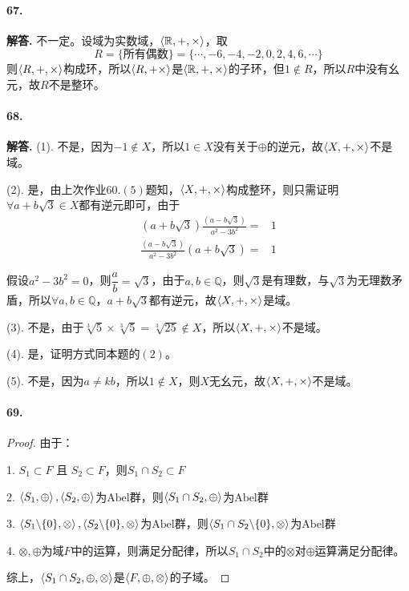 \documentclass[12pt, a4paper, oneside]{ctexart}
\newenvironment{solution}{\par\noindent\textbf{解答. }}{\bigskip\par}
\begin{document}
\paragraph{67.}\begin{solution}
    不一定。设域为实数域，$\braket{\mathbb{R}, +, \times}$，取
    \begin{equation*}
        R = \{\text{所有偶数}\} = \{\cdots, -6,-4,-2,0,2,4,6,\cdots\}
    \end{equation*}
    则$\braket{R,+,\times}$构成环，所以$\braket{R,+\times}$是$\braket{\mathbb{R},+,\times}$的子环，但$1\notin R$，所以$R$中没有幺元，故$R$不是整环。
\end{solution}
\paragraph{68.}\begin{solution}
    (1). 不是，因为$-1\notin X$，所以$1\in X$没有关于$\oplus$的逆元，故$\braket{X,+,\times}$不是域。

    (2). 是，由上次作业$60.(5)$题知，$\braket{X,+,\times}$构成整环，则只需证明$\forall a+b\sqrt{3}\in X$都有逆元即可，由于
    \begin{equation*}
        \begin{aligned}
            (a+b\sqrt{3})\frac{(a-b\sqrt{3})}{a^2-3b^2} =& 1\\
            \frac{(a-b\sqrt{3})}{a^2-3b^2}(a+b\sqrt{3}) =& 1
        \end{aligned}
    \end{equation*}

    假设$a^2-3b^2 = 0$，则$\dfrac{a}{b} = \sqrt{3}$，由于$a, b\in \mathbb Q$，则$\sqrt{3}$是有理数，与$\sqrt{3}$为无理数矛盾，所以$\forall a,b\in \mathbb{Q}$，$a+b\sqrt{3}$都有逆元，故$\braket{X,+,\times}$是域。

    (3). 不是，由于$\sqrt[3]{5}\times \sqrt[3]{5} = \sqrt[3]{25}\notin X$，所以$\braket{X,+,\times}$不是域。

    (4). 是，证明方式同本题的$(2)$。

    (5). 不是，因为$a\neq kb$，所以$1\notin X$，则$X$无幺元，故$\braket{X,+,\times}$不是域。
\end{solution}
\paragraph{69.} \begin{proof}
    由于：

    1. $S_1\subset F\text{ 且 }S_2\subset F$，则$S_1\cap S_2\subset F$

    2. $\braket{S_1, \oplus},\braket{S_2, \oplus}$为$\text{Abel}$群，则$\braket{S_1\cap S_2, \oplus}$为$\text{Abel}$群

    3. $\braket{S_1\backslash\{0\}, \otimes},\braket{S_2\backslash\{0\}, \otimes}$为$\text{Abel}$群，则$\braket{S_1\cap S_2\backslash\{0\}, \otimes}$为$\text{Abel}$群

    4. $\otimes, \oplus$为域$F$中的运算，则满足分配律，所以$S_1\cap S_2$中的$\otimes$对$\oplus$运算满足分配律。

    综上，$\braket{S_1\cap S_2,\oplus,\otimes}$是$\braket{F,\oplus,\otimes}$的子域。
\end{proof}
\end{document}
